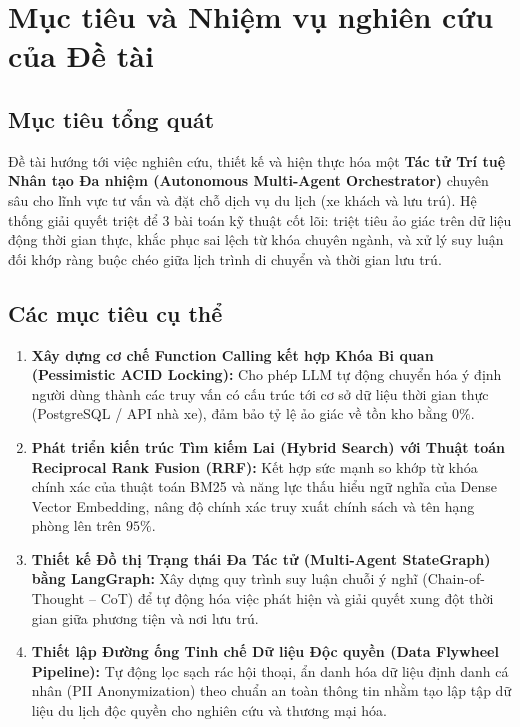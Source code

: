 \section{Mục tiêu và Nhiệm vụ nghiên cứu của Đề tài}

\subsection{Mục tiêu tổng quát}
Đề tài hướng tới việc nghiên cứu, thiết kế và hiện thực hóa một \textbf{Tác tử Trí tuệ Nhân tạo Đa nhiệm (Autonomous Multi-Agent Orchestrator)} chuyên sâu cho lĩnh vực tư vấn và đặt chỗ dịch vụ du lịch (xe khách và lưu trú). Hệ thống giải quyết triệt để 3 bài toán kỹ thuật cốt lõi: triệt tiêu ảo giác trên dữ liệu động thời gian thực, khắc phục sai lệch từ khóa chuyên ngành, và xử lý suy luận đối khớp ràng buộc chéo giữa lịch trình di chuyển và thời gian lưu trú.

\subsection{Các mục tiêu cụ thể}
\begin{enumerate}
    \item \textbf{Xây dựng cơ chế Function Calling kết hợp Khóa Bi quan (Pessimistic ACID Locking):} Cho phép LLM tự động chuyển hóa ý định người dùng thành các truy vấn có cấu trúc tới cơ sở dữ liệu thời gian thực (PostgreSQL / API nhà xe), đảm bảo tỷ lệ ảo giác về tồn kho bằng $0\%$.
    \item \textbf{Phát triển kiến trúc Tìm kiếm Lai (Hybrid Search) với Thuật toán Reciprocal Rank Fusion (RRF):} Kết hợp sức mạnh so khớp từ khóa chính xác của thuật toán BM25 và năng lực thấu hiểu ngữ nghĩa của Dense Vector Embedding, nâng độ chính xác truy xuất chính sách và tên hạng phòng lên trên $95\%$.
    \item \textbf{Thiết kế Đồ thị Trạng thái Đa Tác tử (Multi-Agent StateGraph) bằng LangGraph:} Xây dựng quy trình suy luận chuỗi ý nghĩ (Chain-of-Thought -- CoT) để tự động hóa việc phát hiện và giải quyết xung đột thời gian giữa phương tiện và nơi lưu trú.
    \item \textbf{Thiết lập Đường ống Tinh chế Dữ liệu Độc quyền (Data Flywheel Pipeline):} Tự động lọc sạch rác hội thoại, ẩn danh hóa dữ liệu định danh cá nhân (PII Anonymization) theo chuẩn an toàn thông tin nhằm tạo lập tập dữ liệu du lịch độc quyền cho nghiên cứu và thương mại hóa.
\end{enumerate}
